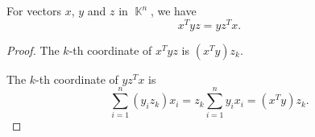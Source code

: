 \begin{lemma}\label{thm:dot_product_and_outer_product}
  For vectors \( x \), \( y \) and \( z \) in \( \BbbK^n \), we have
  \begin{equation*}
    x^T y z = y z^T x.
  \end{equation*}
\end{lemma}
\begin{proof}
  The \( k \)-th coordinate of \( x^T y z \) is \( (x^T y) z_k \).

  The \( k \)-th coordinate of \( y z^T x \) is
  \begin{equation*}
    \sum_{i=1}^n (y_i z_k) x_i
    =
    z_k \sum_{i=1}^n y_i x_i
    =
    (x^T y) z_k.
  \end{equation*}
\end{proof}

